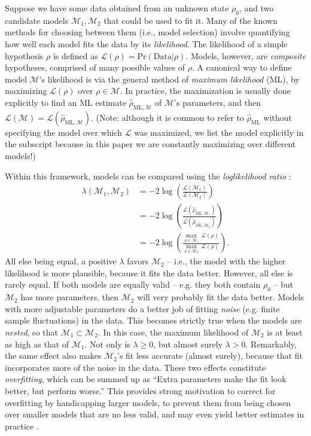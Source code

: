 \documentclass[aps,pra, twocolumn]{revtex4-1}
\newcommand{\M}{\mathcal{M}}
\newcommand{\cL}{\mathcal{L}}
\newcommand{\rhohat}{\hat{\rho}}
\newcommand{\rhoML}[1]{\rhohat_{\scriptscriptstyle{\mathrm{ML},#1}}}
\begin{document}
Suppose we have some data obtained from an unknown state $\rho_{0}$, and two candidate models $\M_{1}, \M_{2}$ that could be used to fit it.  Many of the known methods for choosing between them (i.e., model selection) involve quantifying how well each model fits the data by its \emph{likelihood}.  The likelihood of a simple hypothesis $\rho$ is defined as $\mathcal{L}(\rho) = \mathrm{Pr}(\mathrm{Data}|\rho)$.  Models, however, are \emph{composite} hypotheses, comprised of many possible values of $\rho$.  A canonical way to define model $\M$'s likelihood is via the general method of \emph{maximum likelihood} (ML), by maximizing $\cL(\rho)$ over $\rho\in\M$.  In practice, the maximization is usually done explicitly to find an ML estimate $\hat{\rho}_{\mathrm{ML},\M}$ \cite{Hradil1997, JamesPRA2001, Blume-Kohout2010} of $\M$'s parameters, and then $\cL(\M) = \cL(\hat{\rho}_{\mathrm{ML},\M})$.  (Note: although it is common to refer to $\hat\rho_{\mathrm{ML}}$ without specifying the model over which $\cL$ was maximized, we list the model explicitly in the subscript because in this paper we are constantly maximizing over different models!)

Within this framework, models can be compared using the \emph{loglikelihood ratio} \cite{Neyman1933, Blume-Kohout2010, Moroder2013}:
\begin{align}
\lambda(\M_{1}, \M_{2}) &= -2 \log \left(\frac{\cL(\M_{1})}{\cL(\M_{2})}\right)\\
&= -2 \log \left(\frac{\cL(\rhoML{\M_{1}})}{\cL(\rhoML{\M_{2}})}\right)\\
&= -2 \log \left(\frac{\underset{\rho \in \M_{1}}{\max}~\cL(\rho)}{\underset{\rho \in \M_{2}}{\max}~\cL(\rho)}\right).
\end{align}
All else being equal, a positive $\lambda$ favors $\M_2$ -- i.e., the model with the higher likelihood is more plausible, because it fits the data better.  However, all else is rarely equal.  If both models are equally valid -- e.g. they both contain $\rho_0$ -- but $\M_2$ has more parameters, then $\M_2$ will very probably fit the data better.  Models with more adjustable parameters do a better job of fitting \emph{noise} (e.g. finite sample fluctuations) in the data.  This becomes strictly true when the models are \emph{nested}, so that $\M_{1} \subset \M_{2}$.  In this case, the maximum likelihood of $\M_{2}$ is at least as high as that of $\M_{1}$.  Not only is $\lambda \geq 0$, but almost surely $\lambda > 0$.  Remarkably, the same effect also makes $\M_{2}$'s fit less accurate (almost surely), because that fit incorporates more of the noise in the data.  These two effects constitute \emph{overfitting}, which can be summed up as ``Extra parameters make the fit look better, but perform worse.''  This provides strong motivation to correct for overfitting by handicapping larger models, to prevent them from being chosen over smaller models that are no less valid, and may even yield better estimates in practice \cite{Akaike1974}.
\end{document}
